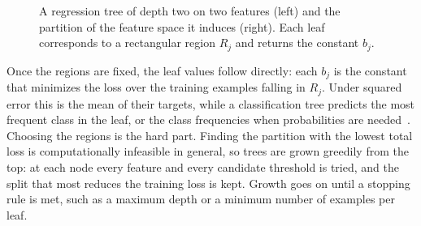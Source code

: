     \begin{figure}[h]
    \centering
    \caption{A regression tree of depth two on two features (left) and the
    partition of the feature space it induces (right). Each leaf corresponds to a
    rectangular region $R_j$ and returns the constant $b_j$.}
    \label{fig:bg:gbm:tree}
    \end{figure}
    
    Once the regions are fixed, the leaf values follow directly: each $b_j$ is the
    constant that minimizes the loss over the training examples falling in $R_j$.
    Under squared error this is the mean of their targets, while a classification
    tree predicts the most frequent class in the leaf, or the class frequencies
    when probabilities are needed~\cite{hastie2009}. Choosing the regions is the
    hard part. Finding the partition with the lowest total loss is computationally
    infeasible in general, so trees are grown greedily from the top: at each node
    every feature and every candidate threshold is tried, and the split that most
    reduces the training loss is kept. Growth goes on
    until a stopping rule is met, such as a maximum depth or a minimum number of
    examples per leaf.

